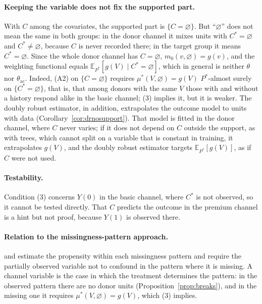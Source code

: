 \documentclass[11pt,a4paper]{article}
\newcommand{\E}{\mathbb{E}}
\newcommand{\thac}{\theta_{\mathrm{ac}}}
\newcommand{\vacio}{\varnothing}
\theoremstyle{plain}
\theoremstyle{definition}
\begin{document}
\paragraph{Keeping the variable does not fix the supported part.} With $C$ among the covariates, the supported part is $\{C=\vacio\}$. But ``$\vacio$'' does not mean the same in both groups: in the donor channel it mixes units with $C^*=\vacio$ and $C^*\ne\vacio$, because $C$ is never recorded there; in the target group it means $C^*=\vacio$. Since the whole donor channel has $C=\vacio$, $m_0(v,\vacio)=g(v)$, and the weighting functional equals $\E_{P^*}[g(V)\mid C^*=\vacio]$, which in general is neither $\theta$ nor $\thac$. Indeed, (A2) on $\{C=\vacio\}$ requires $\mu^*(V,\vacio)=g(V)$ $P^*$-almost surely on $\{C^*=\vacio\}$, that is, that among donors with the same $V$ those with and without a history respond alike in the basic channel; (3) implies it, but it is weaker. The doubly robust estimator, in addition, extrapolates the outcome model to units with data (Corollary~\ref{cor:drnosupport}). That model is fitted in the donor channel, where $C$ never varies; if it does not depend on $C$ outside the support, as with trees, which cannot split on a variable that is constant in training, it extrapolates $g(V)$, and the doubly robust estimator targets $\E_{P^*}[g(V)]$, as if $C$ were not used.

\paragraph{Testability.} Condition (3) concerns $Y(0)$ in the basic channel, where $C^*$ is not observed, so it cannot be tested directly. That $C$ predicts the outcome in the premium channel is a hint but not proof, because $Y(1)$ is observed there.

\paragraph{Relation to the missingness-pattern approach.} \citet{dagostino2000} and \citet{blake2020} estimate the propensity within each missingness pattern and require the partially observed variable not to confound in the pattern where it is missing. A channel variable is the case in which the treatment determines the pattern: in the observed pattern there are no donor units (Proposition~\ref{prop:breaks}), and in the missing one it requires $\mu^*(V,\vacio)=g(V)$, which (3) implies.
\end{document}
